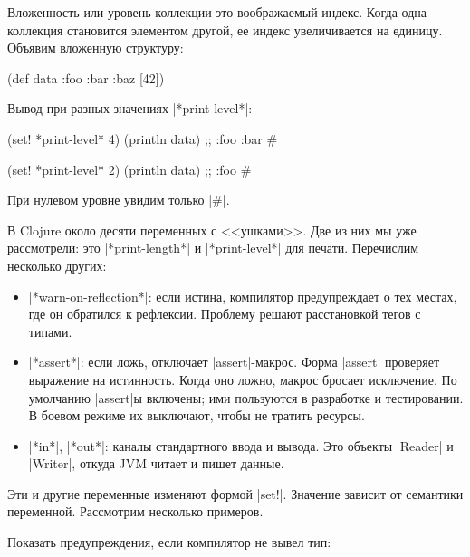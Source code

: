 Вложенность или уровень коллекции это воображаемый индекс. Когда одна коллекция
становится элементом другой, ее индекс увеличивается на единицу. Объявим
вложенную структуру:

\begin{english}
  \begin{clojure}
(def data {:foo {:bar {:baz [42]}}})
  \end{clojure}
\end{english}

\noindent
Вывод при разных значениях \spverb|*print-level*|:

\begin{english}
  \begin{clojure}
(set! *print-level* 4)
(println data)
;; {:foo {:bar #}}

(set! *print-level* 2)
(println data)
;; {:foo #}
  \end{clojure}
\end{english}

\noindent
При нулевом уровне увидим только \spverb|#|.

В Clojure около десяти переменных с <<ушками>>. Две из них мы уже рассмотрели:
это \spverb|*print-length*| и \spverb|*print-level*| для печати. Перечислим
несколько других:

\begin{itemize}

\item
  \spverb|*warn-on-reflection*|: если истина, компилятор предупреждает о тех
  местах, где он обратился к рефлексии. Проблему решают расстановкой тегов с
  типами.

\item
  \spverb|*assert*|: если ложь, отключает \spverb|assert|-макрос. Форма \spverb|assert|
  проверяет выражение на истинность. Когда оно ложно, макрос бросает исключение.
  По умолчанию \spverb|assert|ы включены; ими пользуются в разработке и тестировании.
  В боевом режиме их выключают, чтобы не тратить ресурсы.

\item
  \spverb|*in*|, \spverb|*out*|: каналы стандартного ввода и вывода. Это объекты
  \spverb|Reader| и \spverb|Writer|, откуда JVM читает и пишет данные.

\end{itemize}

Эти и другие переменные изменяют формой \spverb|set!|. Значение зависит от
семантики переменной. Рассмотрим несколько примеров.

Показать предупреждения, если компилятор не вывел тип:

